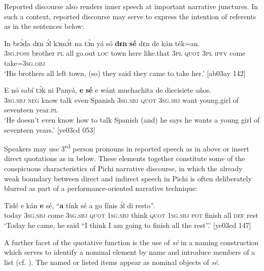 Reported discourse also renders inner speech at important narrative junctures. In such a context, reported discourse may serve to express the intention of referents as in the sentences below:


\ea%
    \label{ex:key:1373}
    \gll In    brɔ́da  dɛn  ɔ́l  kɔmɔ́t  na  tɔ́n    yá    só  
\textbf{dɛn}  \textbf{sé} dɛn  de  kán    ték=an.\\
\textsc{3sg.poss}  brother  \textsc{pl}  all  go.out  \textsc{loc}  town  here    like.that
\textsc{3pl}  \textsc{quot} \textsc{3pl}  \textsc{ipfv}  come  take=\textsc{3sg.obj}\\

\glt ‘His brothers all left town, (so) they said they came to take her.’ [ab03ay 142]
\z


\ea%
    \label{ex:key:1374}
    \gll E    nó  sabí    tɔ́k  ni    Panyá,  \textbf{e}    \textbf{sé} e    wánt
muchachita  de  diecisiete  años.\\
\textsc{3sg.sbj}  \textsc{neg}  know  talk  even  Spanish  \textsc{3sg.sbj}  \textsc{quot}    \textsc{3sg.sbj}  want
young.girl  of  seventeen  year.\textsc{pl}\\

\glt ‘He doesn’t even know how to talk Spanish (and) he says he wants a young girl 
of seventeen years.’ [ye03cd 053]
\z

Speakers may use 3\textsuperscript{rd} person pronouns in reported speech as in  above or insert direct quotations as in  below. These elements together constitute some of the conspicuous characteristics of Pichi narrative discourse, in which the already weak boundary between direct and indirect speech in Pichi is often deliberately blurred as part of a performance-oriented narrative technique:


\ea%
    \label{ex:key:1375}
    \gll Tidé    e    kán    \textbf{e}    sé,    “\textbf{a}    tínk    sé
a    go  fínis    ɔ́l  di  resto”.\\
today  \textsc{3sg.sbj}  come  \textsc{3sg.sbj}  \textsc{quot}    \textsc{1sg.sbj}  think  \textsc{quot}  
\textsc{1sg.sbj}  \textsc{pot} finish  all  \textsc{def}  rest\\

\glt ‘Today he came, he said “I think I am going to finish all the rest”.’ [ye03cd 147]
\z

A further facet of the quotative function is the use of \textit{sé} in a naming construction which serves to identify a nominal element by name and introduce members of a list (cf. \citealt[398]{Güldemann2008}). The named or listed items appear as nominal objects of \textit{sé}. 


